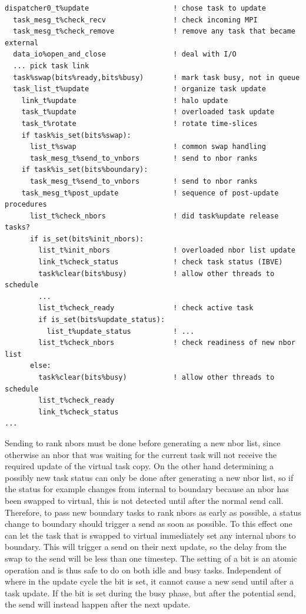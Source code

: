 \documentclass[paper=a4,fontsize=11pt]{scrartcl}
\numberwithin{equation}{section}		%
\numberwithin{figure}{section}			%
\numberwithin{table}{section}				%
\newcommand{\codecolor}{\color{Blue}}
\begin{document}
{\small\codecolor\begin{verbatim}
dispatcher0_t%update                    ! chose task to update
  task_mesg_t%check_recv                ! check incoming MPI
  task_mesg_t%check_remove              ! remove any task that became external
  data_io%open_and_close                ! deal with I/O
  ... pick task link
  task%swap(bits%ready,bits%busy)       ! mark task busy, not in queue
  task_list_t%update                    ! organize task update
    link_t%update                       ! halo update
    task_t%update                       ! overloaded task update
    task_t%rotate                       ! rotate time-slices
    if task%is_set(bits%swap):
      list_t%swap                       ! common swap handling
      task_mesg_t%send_to_vnbors        ! send to nbor ranks
    if task%is_set(bits%boundary):
      task_mesg_t%send_to_vnbors        ! send to nbor ranks
    task_mesg_t%post_update             ! sequence of post-update procedures
      list_t%check_nbors                ! did task%update release tasks?
      if is_set(bits%init_nbors):
        list_t%init_nbors               ! overloaded nbor list update
        link_t%check_status             ! check task status (IBVE)
        task%clear(bits%busy)           ! allow other threads to schedule       
        ...
        list_t%check_ready              ! check active task
        if is_set(bits%update_status):
          list_t%update_status          ! ...
        list_t%check_nbors              ! check readiness of new nbor list
      else:
        task%clear(bits%busy)           ! allow other threads to schedule
        list_t%check_ready
        link_t%check_status
...
\end{verbatim}}\noindent
Sending to rank nbors must be done before generating a new nbor list, since otherwise an nbor that was waiting for the current task will not receive the required update of the virtual task copy.
On the other hand determining a possibly new task status can only be done after generating a new nbor list, so if the status for example changes from internal to boundary because an nbor has been swapped to virtual, this is not detected until after the normal send call.  Therefore, to pass new boundary tasks to rank nbors as early as possible, a status change to boundary should trigger a send as soon as possible.  To this effect one can let the task that is swapped to virtual immediately set any internal nbors to boundary.  This will trigger a send on their next update, so the delay from the swap to the send will be less than one timestep. The setting of a bit is an atomic operation and is thus safe to do on both idle and busy tasks.  Independent of where in the update cycle the bit is set, it cannot cause a new send until after a task update.  If the bit is set during the busy phase, but after the potential send, the send will instead happen after the next update.
\end{document}
